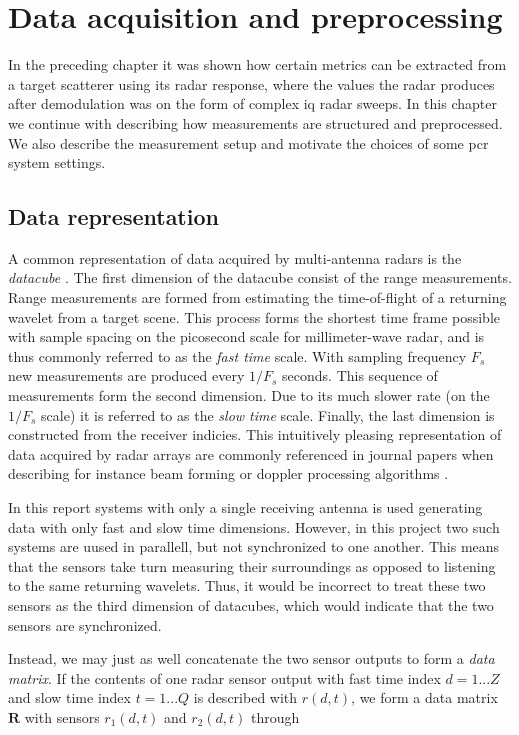 \chapter{Data acquisition and preprocessing}

In the preceding chapter it was shown how certain metrics can be extracted from a target scatterer using its radar response, where the values the radar produces after demodulation was on the form of complex \gls{iq} radar sweeps. In this chapter we continue with describing how measurements are structured and preprocessed. We also describe the measurement setup and motivate the choices of some \gls{pcr} system settings.

\section{Data representation}

A common representation of data acquired by multi-antenna radars is the \emph{datacube} \citep{richards_2014}. The first dimension of the datacube consist of the range measurements. Range measurements are formed from estimating the time-of-flight of a returning wavelet from a target scene. This process forms the shortest time frame possible with sample spacing on the picosecond scale for millimeter-wave radar, and is thus commonly referred to as the \emph{fast time} scale. With sampling frequency $F_s$ new measurements are produced every $1/F_s$ seconds. This sequence of measurements form the second dimension. Due to its much slower rate (on the $1/F_s$ scale) it is referred to as the \emph{slow time} scale. Finally, the last dimension is constructed from the receiver indicies. This intuitively pleasing representation of data acquired by radar arrays are commonly referenced in journal papers when describing for instance beam forming or doppler processing algorithms \citep{gentile_donovan_2018}. 

In this report systems with only a single receiving antenna is used generating data with only fast and slow time dimensions. However, in this project two such systems are uused in parallell, but not synchronized to one another. This means that the sensors take turn measuring their surroundings as opposed to listening to the same returning wavelets. Thus, it would be incorrect to treat these two sensors as the third dimension of datacubes, which would indicate that the two sensors are synchronized.

Instead, we may just as well concatenate the two sensor outputs to form a \emph{data matrix}. If the contents of one radar sensor output with fast time index $d=1...Z$ and slow time index $t=1...Q$ is described with $r(d,t)$, we form a data matrix $\mathbf{R}$ with sensors $r_1(d,t)$ and $r_2(d,t)$ through

